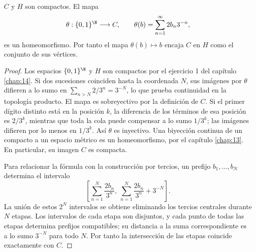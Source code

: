 \begin{proposicion}\label{ch16:cantor}
$C$ y $H$ son compactos. El mapa
\[
\theta:\{0,1\}^{\N}\longrightarrow C,\qquad
\theta(b)=\sum_{n=1}^\infty2b_n3^{-n},
\]
es un homeomorfismo. Por tanto el mapa $\theta(b)\mapsto b$ encaja $C$ en $H$ como el conjunto de sus vértices.
\end{proposicion}
\begin{proof}
Los espacios $\{0,1\}^{\N}$ y $H$ son compactos por el ejercicio 1 del capítulo \ref{chap:14}. Si dos sucesiones coinciden hasta la coordenada $N$, sus imágenes por $\theta$ difieren a lo sumo en $\sum_{n>N}2/3^n=3^{-N}$, lo que prueba continuidad en la topología producto. El mapa es sobreyectivo por la definición de $C$. Si el primer dígito distinto está en la posición $k$, la diferencia de los términos de esa posición es $2/3^k$, mientras que toda la cola puede compensar a lo sumo $1/3^k$; las imágenes difieren por lo menos en $1/3^k$. Así $\theta$ es inyectivo. Una biyección continua de un compacto a un espacio métrico es un homeomorfismo, por el capítulo \ref{chap:13}. En particular, su imagen $C$ es compacta.

Para relacionar la fórmula con la construcción por tercios, un prefijo $b_1,\ldots,b_N$ determina el intervalo
\[
\left[\sum_{n=1}^N\frac{2b_n}{3^n},\ 
\sum_{n=1}^N\frac{2b_n}{3^n}+3^{-N}\right].
\]
La unión de estos $2^N$ intervalos se obtiene eliminando los tercios centrales durante $N$ etapas. Los intervalos de cada etapa son disjuntos, y cada punto de todas las etapas determina prefijos compatibles; su distancia a la suma correspondiente es a lo sumo $3^{-N}$ para todo $N$. Por tanto la intersección de las etapas coincide exactamente con $C$.
\end{proof}

